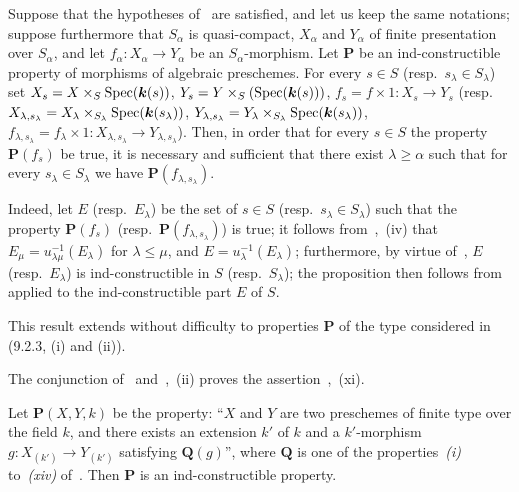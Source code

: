\begin{proposition}[9.3.3]
\label{IV.9.3.3}
Suppose that the hypotheses of~ are satisfied, and let us keep the same notations; suppose furthermore that $S_\alpha$ is quasi-compact, $X_\alpha$ and $Y_\alpha$ of finite presentation over $S_\alpha$, and let $f_\alpha:X_\alpha\to Y_\alpha$ be an $S_\alpha$-morphism.
Let $\boldsymbol{P}$ be an ind-constructible property of morphisms of algebraic preschemes.
For every $s\in S$ \textnormal{(resp.}\ $s_\lambda\in S_\lambda$\textnormal{)} set $X_s=X\times_S\operatorname{Spec}(\boldsymbol{k}(s))$, $Y_s=Y\times_S(\operatorname{Spec}(\boldsymbol{k}(s)))$, $f_s=f\times 1:X_s\to Y_s$ \textnormal{(resp.}\ $X_{\lambda,s_\lambda}=X_\lambda\times_{S_\lambda}\operatorname{Spec}(\boldsymbol{k}(s_\lambda))$, $Y_{\lambda,s_\lambda}=Y_\lambda\times_{S_\lambda}\operatorname{Spec}(\boldsymbol{k}(s_\lambda))$, $f_{\lambda,s_\lambda}=f_\lambda\times 1:X_{\lambda,s_\lambda}\to Y_{\lambda,s_\lambda}$\textnormal{)}.
Then, in order that for every $s\in S$ the property $\boldsymbol{P}(f_s)$ be true, it is necessary and sufficient that there exist $\lambda\geqslant\alpha$ such that for every $s_\lambda\in S_\lambda$ we have $\boldsymbol{P}(f_{\lambda,s_\lambda})$.
\end{proposition}

Indeed, let $E$ (resp.\ $E_\lambda$) be the set of $s\in S$ (resp.\ $s_\lambda\in S_\lambda$) such that the property $\boldsymbol{P}(f_s)$ (resp.\ $\boldsymbol{P}(f_{\lambda,s_\lambda})$) is true; it follows from~,~(iv) that $E_\mu=u_{\lambda\mu}^{-1}(E_\lambda)$ for $\lambda\leqslant\mu$, and $E=u_\lambda^{-1}(E_\lambda)$; furthermore, by virtue of~, $E$ (resp.\ $E_\lambda$) is ind-constructible in $S$ (resp.\ $S_\lambda$); the proposition then follows from~ applied to the ind-constructible part $E$ of $S$.


This result extends without difficulty to properties $\boldsymbol{P}$ of the type considered in (9.2.3, (i) and (ii)).

\begin{remark}[9.3.4]
\label{IV.9.3.4}
The conjunction of~ and~,~(ii) proves the assertion~,~(xi).
\end{remark}

\begin{proposition}[9.3.5]
\label{IV.9.3.5}
Let $\boldsymbol{P}(X,Y,k)$ be the property: ``$X$ and $Y$ are two preschemes of finite type over the field $k$, and there exists an extension $k'$ of $k$ and a $k'$-morphism $g:X_{(k')}\to Y_{(k')}$ satisfying $\boldsymbol{Q}(g)$'', where $\boldsymbol{Q}$ is one of the properties~\emph{(i)} to~\emph{(xiv)} of~.
Then $\boldsymbol{P}$ is an ind-constructible property.
\end{proposition}

